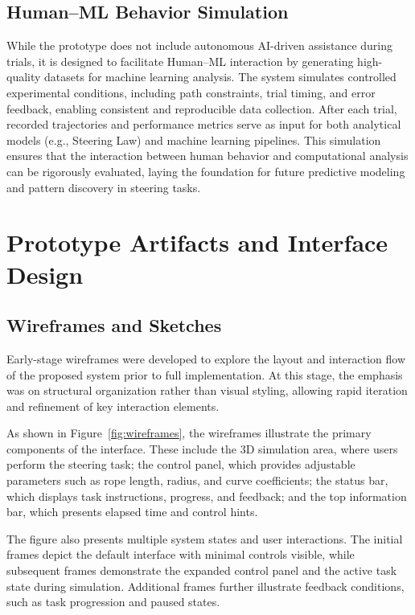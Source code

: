 \documentclass[sigconf]{acmart}
\begin{document}
\subsection{Human--ML Behavior Simulation}

While the prototype does not include autonomous AI-driven assistance during trials, it is designed to facilitate Human--ML interaction by generating high-quality datasets for machine learning analysis. The system simulates controlled experimental conditions, including path constraints, trial timing, and error feedback, enabling consistent and reproducible data collection. After each trial, recorded trajectories and performance metrics serve as input for both analytical models (e.g., Steering Law) and machine learning pipelines. This simulation ensures that the interaction between human behavior and computational analysis can be rigorously evaluated, laying the foundation for future predictive modeling and pattern discovery in steering tasks.
\section{Prototype Artifacts and Interface Design}

\subsection{Wireframes and Sketches}

Early-stage wireframes were developed to explore the layout and interaction flow of the proposed system prior to full implementation. At this stage, the emphasis was on structural organization rather than visual styling, allowing rapid iteration and refinement of key interaction elements.

As shown in Figure~\autoref{fig:wireframes}, the wireframes illustrate the primary components of the interface. These include the 3D simulation area, where users perform the steering task; the control panel, which provides adjustable parameters such as rope length, radius, and curve coefficients; the status bar, which displays task instructions, progress, and feedback; and the top information bar, which presents elapsed time and control hints.

The figure also presents multiple system states and user interactions. The initial frames depict the default interface with minimal controls visible, while subsequent frames demonstrate the expanded control panel and the active task state during simulation. Additional frames further illustrate feedback conditions, such as task progression and paused states.
\end{document}
